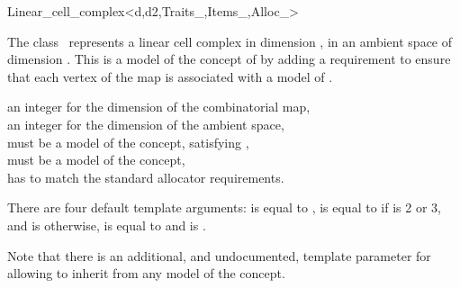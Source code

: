 \ccRefPageBegin
\begin{ccRefClass}{Linear_cell_complex<d,d2,Traits_,Items_,Alloc_>}


\ccDefinition
  
The class \ccRefName\ represents a linear cell complex in dimension ,
in an ambient space of dimension . This is a model of the concept of
 by adding a requirement to ensure that
each vertex of the map is associated with a
model of .


\ccIsModel

\ccInheritsFrom
{}

\ccParameters
{} an integer for the dimension of the combinatorial map,\\
 an integer for the dimension of the ambient space,\\
 must be a model of the  concept, satisfying ,\\
 must be a model of the  concept,\\
 has to match the standard allocator requirements. 

There are four default template arguments:
 is equal to ,
 is equal to  if
 is 2 or 3, and is  otherwise,
 is equal to  and
 is .

\begin{ccAdvanced}
  Note that there is an additional, and undocumented, template
  parameter  for
   allowing
  to inherit from any model of the  concept.
\end{ccAdvanced}


\end{ccRefClass}

